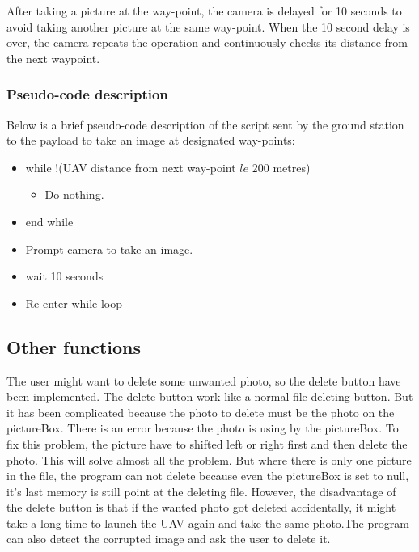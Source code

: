After taking a picture at the way-point, the camera
is delayed for 10 seconds to avoid taking another picture
at the same way-point. When the 10 second delay is over,
the camera repeats the operation and continuously checks
its distance from the next waypoint.

\subsubsection{Pseudo-code description}

Below is a brief pseudo-code description of the script
sent by the ground station to the payload to take an
image at designated way-points:

\begin{itemize}
	\item while !(UAV distance from next way-point $le$ 200 metres)
		\begin{itemize}
			\item Do nothing.
		\end{itemize}
	\item end while
	\item Prompt camera to take an image.
	\item wait 10 seconds
	\item Re-enter while loop
\end{itemize}

\subsection{Other functions}
The user might want to delete some unwanted photo, so the delete button have been implemented. The delete button work like a normal file deleting button. But it has been complicated because the photo to delete must be the photo on the pictureBox. There is an error because the photo is using by the pictureBox. To fix this problem, the picture have to shifted left or right first and then delete the photo. This will solve almost all the problem. But where there is only one picture in the file, the program can not delete because even the pictureBox is set to null, it's last memory is still point at the deleting file. However, the disadvantage of the delete button is that if the wanted photo got deleted accidentally, it might take a long time to launch the UAV again and take the same photo.The program can also detect the corrupted image and ask the user to delete it.

